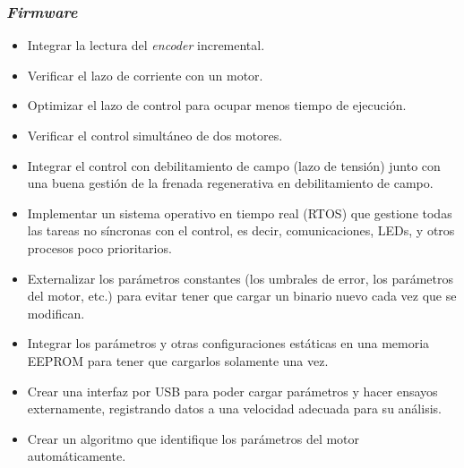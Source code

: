 \subsubsection{\textit{Firmware}}

\begin{itemize}
	\item Integrar la lectura del \textit{encoder} incremental.
	\item Verificar el lazo de corriente con un motor.
	\item Optimizar el lazo de control para ocupar menos tiempo de ejecución.
	\item Verificar el control simultáneo de dos motores.
	\item Integrar el control con debilitamiento de campo (lazo de tensión) junto con una buena gestión de la frenada regenerativa en debilitamiento de campo.
	\item Implementar un sistema operativo en tiempo real (RTOS) que gestione todas las tareas no síncronas con el control, es decir, comunicaciones, LEDs, y otros procesos poco prioritarios.
	\item Externalizar los parámetros constantes (los umbrales de error, los parámetros del motor, etc.) para evitar tener que cargar un binario nuevo cada vez que se modifican.
	\item Integrar los parámetros y otras configuraciones estáticas en una memoria EEPROM para tener que cargarlos solamente una vez.
	\item Crear una interfaz por USB para poder cargar parámetros y hacer ensayos externamente, registrando datos a una velocidad adecuada para su análisis.
	\item Crear un algoritmo que identifique los parámetros del motor automáticamente.
\end{itemize}